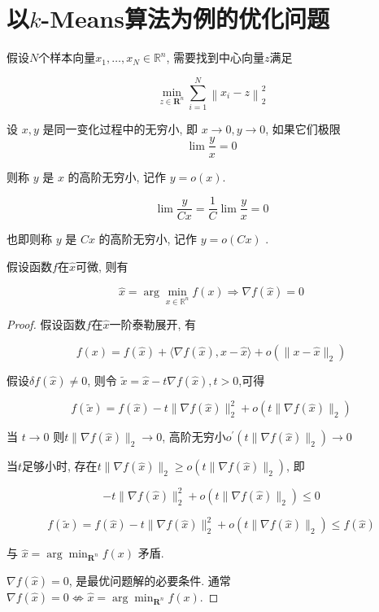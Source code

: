 \chapter{以$k$-Means算法为例的优化问题}
    
\begin{problem}
    \label{Problem:ClusteringCenter}
    假设$N$个样本向量$ x_{1}, \ldots, x_{N} \in \mathbb{R}^{n} $, 需要找到中心向量$z$满足

    $$ \min _{z \in \mathbf{R}^{n}} \sum_{i=1}^{N}\left\|x_{i}-z\right\|_{2}^{2} $$
\end{problem}

\begin{definition}[高阶无穷小记号 $o$]
    设 $ x, y $ 是同一变化过程中的无穷小, 即 $ x \rightarrow 0, y \rightarrow 0 $, 如果它们极限
$$
\lim \frac{y}{x}=0
$$

则称 $ y $ 是 $ x $ 的高阶无穷小, 记作 $ y=o(x) $.
\end{definition}

\begin{corollary}
    $$ \lim \frac{y}{C x}=\frac{1}{C} \lim \frac{y}{x}=0 $$

    也即则称 $ y $ 是 $ C x $ 的高阶无穷小, 记作 $ y=o(C x) $ . 
\end{corollary}

\begin{proposition}[优化求解的必要条件]
    假设函数$f$在$\hat{x}$可微, 则有

    $$ \hat{x}=\arg \min _{x \in \mathbb{R}^{n}} f(x) \Rightarrow \nabla f(\hat{x})=0 $$
\end{proposition}

\begin{proof}
    假设函数$f$在$\hat{x}$一阶泰勒展开, 有

    $$ f(x)=f(\hat{x})+\langle\nabla f(\hat{x}), x-\hat{x}\rangle+o\left(\|x-\hat{x}\|_{2}\right) $$

    假设$ \delta f(\hat{x}) \neq 0 $, 则令 $ \tilde{x}=\hat{x}-t \nabla f(\hat{x}), t>0 $,可得

    $$ f(\tilde{x})=f(\hat{x})-t\|\nabla f(\hat{x})\|_{2}^{2}+o\left(t\|\nabla f(\hat{x})\|_{2}\right) $$

    当 $ t \rightarrow 0 $ 则$ t\|\nabla f(\hat{x})\|_{2} \rightarrow 0 $,  高阶无穷小$ {o }^{\prime}\left(t\|\nabla f(\hat{x})\|_{2}\right) \rightarrow 0 $

    当$t$足够小时, 存在$ t\|\nabla f(\hat{x})\|_{2} \geq o\left(t\|\nabla f(\hat{x})\|_{2}\right) $, 即

    $$ -t\|\nabla f(\hat{x})\|_{2}^{2}+o\left(t\|\nabla f(\hat{x})\|_{2}\right) \leq 0 $$

    $$ f(\tilde{x})=f(\hat{x})-t\|\nabla f(\hat{x})\|_{2}^{2}+o\left(t\|\nabla f(\hat{x})\|_{2}\right) \leq f(\hat{x}) $$

    与 $ \hat{x}=\arg \min _{\mathbf{R}^{n}} f(x) $ 矛盾. 

    $ \nabla f(\widehat{x})=0 $, 是最优问题解的必要条件. 通常 $ \nabla f(\hat{x})=0 \not \Leftrightarrow \hat{x}=\arg \min _{\mathbf{R}^{n}} f(x) $. 
\end{proof}

